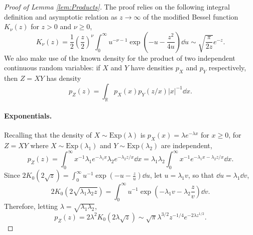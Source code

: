 \documentclass[../thesis.tex]{subfiles}
\begin{document}
\begin{proof}[Proof of Lemma \ref{lem:Products}]
  The proof relies on the following integral definition \cite[pg. 183]{watson1995treatise} and asymptotic relation as $z \to \infty$ \cite[pg. 202]{watson1995treatise} of the modified Bessel function $K_\nu(z)$ for $z > 0$ and $\nu \geq 0$,
  \begin{equation}
    \label{eq:BesselInt}
    K_\nu(z) = \frac12 \left(\frac{z}{2}\right)^\nu \int_0^\infty u^{-\nu-1}\exp\left(-u - \frac{z^2}{4u}\right) \dd u \sim \sqrt{\frac{\pi}{2z}}e^{-z}.
  \end{equation}
  We also make use of the known density for the product of two independent continuous random variables: if $X$ and $Y$ have densities $p_X$ and $p_Y$ respectively, then $Z = XY$ has density
  \[
    p_Z(z) = \int_\mathbb{R} p_X(x) p_Y(z/x) |x|^{-1} \dd x.
  \]
  \paragraph{Exponentials.} Recalling that the density of $X \sim \mathrm{Exp}(\lambda)$ is $p_X(x) = \lambda e^{-\lambda x}$ for $x \geq 0$, for $Z = XY$ where $X \sim \mathrm{Exp}(\lambda_1)$ and $Y \sim \mathrm{Exp}(\lambda_2)$ are independent,
  \[
    p_Z(z) = \int_{0}^{\infty}x^{-1}\lambda_{1}e^{-\lambda_{1}x}\lambda_{2}e^{-\lambda_{2}z/x}\dd x = \lambda_{1}\lambda_{2}\int_{0}^{\infty}x^{-1}e^{-\lambda_{1}x-\lambda_{2}z/x}\dd x.
  \]
  Since $2K_{0}(2\sqrt{z})=\int_{0}^{\infty}u^{-1}\exp(-u-\frac{z}{u})\dd u$, let $u = \lambda_1 v$, so that $\dd u = \lambda_1 \dd v$,
  \[
    2K_{0}(2\sqrt{\lambda_{1}\lambda_{2}z})=\int_{0}^{\infty}u^{-1}\exp\left(-\lambda_{1}v-\lambda_{2}\frac{z}{v}\right)\dd v.
  \]
  Therefore, letting $\lambda = \sqrt{\lambda_1\lambda_2}$,
  \[
    p_Z(z) = 2\lambda^2 K_0(2\lambda\sqrt{z}) \sim \sqrt{\pi} \lambda^{3/2} z^{-1/4} e^{-2\lambda z^{1/2}}.
  \]

\end{proof}
\end{document}
